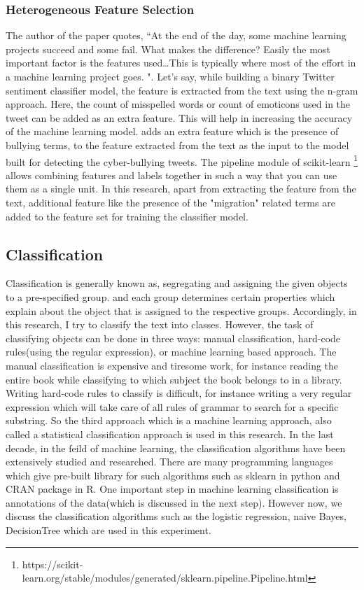 \subsubsection{Heterogeneous Feature Selection} \label{hetero}
The author of the paper \cite{Domingos:2012} quotes, ``At the end of the day, some machine learning projects succeed and some fail. What makes the difference? Easily the most important factor is the features used…This is typically where most of the effort in a machine learning project goes. ".  Let's say, while building a binary Twitter sentiment classifier model, the feature is extracted from the text using the n-gram approach. Here, the count of misspelled words or count of emoticons used in the tweet can be added as an extra feature. This will help in increasing the accuracy of the machine learning model. \cite{Cortis} adds an extra feature which is the presence of bullying terms, to the feature extracted from the text as the input to the model built for detecting the cyber-bullying tweets. The pipeline module of scikit-learn \cite{scikit-learn} \footnote{https://scikit-learn.org/stable/modules/generated/sklearn.pipeline.Pipeline.html} allows combining features and labels together in such a way that you can use them as a single unit. In this research,  apart from extracting the feature from the text, additional feature like the presence of the "migration" related terms are added to the feature set for training the classifier model. 
\subsection{Classification}
Classification is generally known as, segregating and assigning the given objects to a pre-specified group. and each group determines certain properties which explain about the object that is assigned to the respective groups. Accordingly, in this research, I try to classify the text into classes. However, the task of classifying objects can be done in three ways:  manual classification, hard-code rules(using the regular expression), or machine learning based approach. The manual classification is expensive and tiresome work, for instance reading the entire book while classifying to which subject the book belongs to in a library. Writing hard-code rules to classify is difficult, for instance writing a very regular expression which will take care of all rules of grammar to search for a specific substring. So the third approach which is a machine learning approach, also called a statistical classification approach is used in this research. In the last decade, in the feild of machine learning, the classification algorithms have been extensively studied and researched. There are many programming languages which give pre-built library for such algorithms such as sklearn \cite{scikit-learn} in python and  CRAN package in R. One important step in machine learning classification is annotations of the data(which is discussed in the next step). However now, we discuss the classification algorithms such as the logistic regression, naive Bayes, DecisionTree which are used in this experiment.

